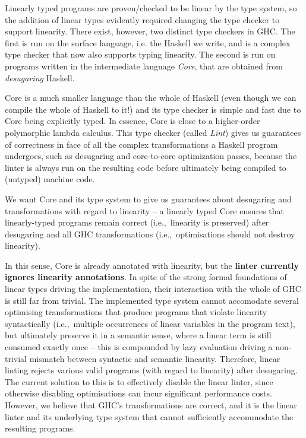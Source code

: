 \documentclass[]{lwnovathesis}
\begin{document}
Linearly typed programs are proven/checked to be linear by the type system, so
the addition of linear types evidently required changing the type checker to
support linearity. There exist, however, two distinct type checkers in GHC.
The first is run on the surface language, i.e. the Haskell we write, and is a
complex type checker that now also supports typing linearity. The second is
run on programs written in the intermediate language \emph{Core}, that
are obtained from \emph{desugaring} Haskell.

Core is a much smaller language than the whole of Haskell (even though we
can compile the whole of Haskell to it!) and its type checker is
simple and fast due to Core being explicitly typed. In essence, Core
is close to a higher-order polymorphic lambda calculus. This type
checker (called \emph{Lint}) gives us guarantees of correctness in face of all
the complex transformations a Haskell program undergoes, such as desugaring and
core-to-core optimization passes, because the linter is always run on the resulting code
before ultimately being compiled to (untyped) machine code.


We want Core and its type system to give us guarantees about
desugaring and transformations with regard to linearity -- a linearly
typed Core ensures that linearly-typed programs remain correct
(i.e.,~linearity is preserved) after desugaring and all GHC
transformations (i.e.,~optimisations should not destroy linearity).

In this sense, Core is already annotated with linearity, but the \textbf{linter currently
  ignores linearity annotations}.
%
In spite of the strong formal foundations of linear types driving the
implementation, their interaction with the whole of GHC is still far
from trivial. The implemented type system cannot accomodate
several optimising transformations that produce programs that violate
linearity syntactically (i.e.,~multiple occurrences of linear
variables in the program text), but ultimately preserve it in a
semantic sense, where a linear term is still consumed exactly once --
this is compounded by lazy evaluation driving a non-trivial mismatch
between syntactic and semantic linearity. Therefore, linear linting
rejects various valid programs (with regard to linearity) after
desugaring. The current solution to this is to effectively disable the
linear linter, since otherwise disabling optimisations can incur significant
performance costs. However, we believe that GHC's transformations are
correct, and it is the linear linter and its underlying type system
that cannot sufficiently accommodate the
resulting programs.
\end{document}
